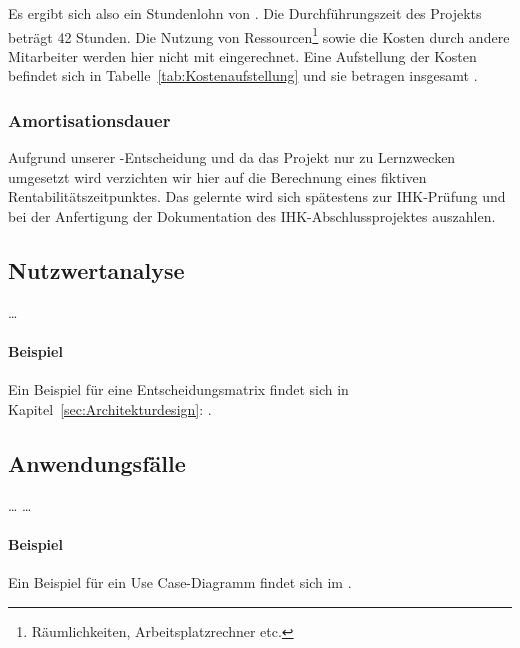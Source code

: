 Es ergibt sich also ein Stundenlohn von . 
Die Durchführungszeit des Projekts beträgt 42 Stunden. 
Die Nutzung von Ressourcen\footnote{Räumlichkeiten, Arbeitsplatzrechner etc.} sowie die Kosten durch andere Mitarbeiter werden hier nicht mit eingerechnet. 
Eine Aufstellung der Kosten befindet sich in Tabelle~\ref{tab:Kostenaufstellung} und sie betragen insgesamt .


\subsubsection{Amortisationsdauer}
\label{sec:Amortisationsdauer}

    Aufgrund unserer -Entscheidung und da das Projekt nur zu Lernzwecken umgesetzt wird verzichten wir hier auf die Berechnung eines fiktiven Rentabilitätszeitpunktes. Das gelernte wird sich spätestens zur IHK-Prüfung und bei der Anfertigung der Dokumentation des IHK-Abschlussprojektes auszahlen.

\subsection{Nutzwertanalyse}
\label{sec:Nutzwertanalyse}
    \dots

\paragraph{Beispiel}
Ein Beispiel für eine Entscheidungsmatrix findet sich in Kapitel~\ref{sec:Architekturdesign}: .


\subsection{Anwendungsfälle}
\label{sec:Anwendungsfaelle}
    \dots
    \dots

\paragraph{Beispiel}
Ein Beispiel für ein Use Case-Diagramm findet sich im .


